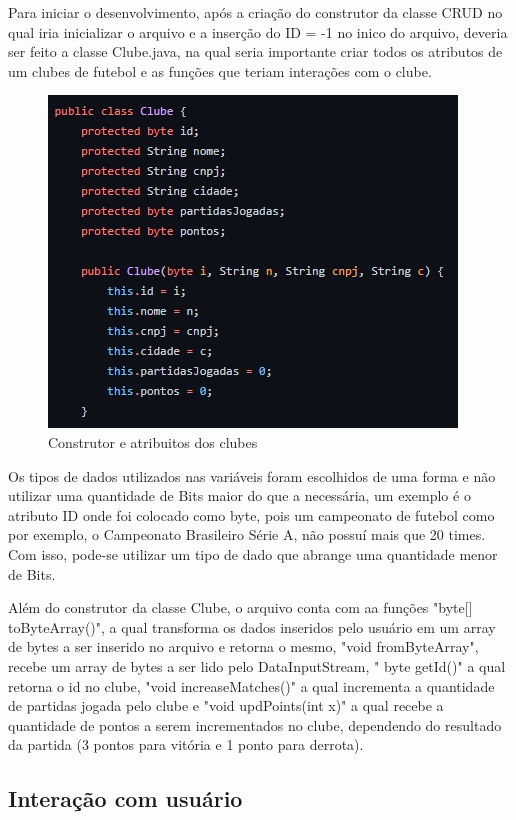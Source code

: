 \documentclass[12pt]{article}
\begin{document}
Para iniciar o desenvolvimento, após a criação do construtor da classe CRUD no qual iria inicializar o arquivo e a inserção do ID = -1 no inico do arquivo, deveria ser feito a classe Clube.java, na qual seria importante criar todos os atributos de um clubes de futebol e as funções que teriam interações com o clube. 

\begin{figure}[ht]
\centering
\includegraphics[width=.5\textwidth]{clubes.jpeg}
\caption{Construtor e atribuitos dos clubes}
\label{fig:exampleFig1}
\end{figure}

Os tipos de dados utilizados nas variáveis foram escolhidos de uma forma e não utilizar uma quantidade de Bits maior do que a necessária, um exemplo é o atributo ID onde foi colocado como byte, pois um campeonato de futebol como por exemplo, o Campeonato Brasileiro Série A, não possuí mais que 20 times. Com isso, pode-se utilizar um tipo de dado que abrange uma quantidade menor de Bits.

Além do construtor da classe Clube, o arquivo conta com aa funções "byte[] toByteArray()", a qual transforma os dados inseridos pelo usuário em um array de bytes a ser inserido no arquivo e retorna o mesmo, "void fromByteArray", recebe um array de bytes a ser lido pelo DataInputStream, " byte getId()" a qual retorna o id no clube, "void increaseMatches()" a qual incrementa a quantidade de partidas jogada pelo clube e "void updPoints(int x)" a qual recebe a quantidade de pontos a serem incrementados no clube, dependendo do resultado da partida (3 pontos para vitória e 1 ponto para derrota).


\subsection{Interação com usuário}
\end{document}
